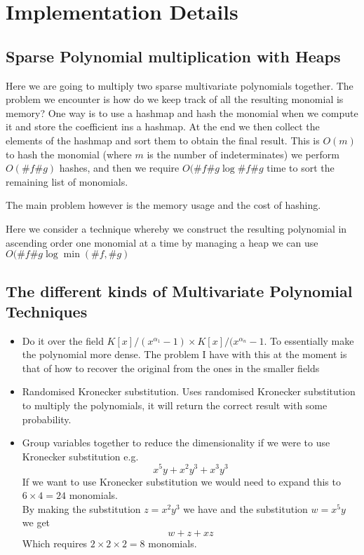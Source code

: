 \chapter{Implementation Details}\label{impl-details}

\section{Sparse Polynomial multiplication with Heaps}


Here we are going to multiply two sparse multivariate polynomials together. The problem we encounter is how do we keep track of all the resulting monomial is memory? One way is to use a hashmap and hash the monomial when we compute it and store the coefficient ins a hashmap. At the end we then collect the elements of the hashmap and sort them to obtain the final result. This is $O(m)$ to hash the monomial (where $m$ is the number of indeterminates) we perform $O(\# f \# g)$ hashes, and then we require $O(\#f \#g \log \# f \# g$ time to sort the remaining list of monomials.

The main problem however is the memory usage and the cost of hashing.

Here we consider a technique whereby we construct the resulting polynomial in ascending order one monomial at a time by managing a heap we can use $O(\#f \#g \log \min(\# f, \# g)$



\section{The different kinds of Multivariate Polynomial Techniques}

\begin{itemize}
    \item Do it over the field $K[x]/(x^{\alpha_1} -1) \times K[x]/(x^{\alpha_n} -1$. To essentially make the polynomial more dense. The problem I have with this at the moment is that of how to recover the original from the ones in the smaller fields
    \item Randomised Kronecker substitution. Uses randomised Kronecker substitution to multiply the polynomials, it will return the correct result with some probability.
    \item Group variables together to reduce the dimensionality if we were to use Kronecker substitution e.g.
        \[
        x^5y + x^2y^3 + x^3y^3
    \]
    If we want to use Kronecker substitution we would need to expand this to $6 \times 4 = 24$ monomials.\\
    By making the substitution $z = x^2y^3$ we have and the substitution $w = x^5y$ we get
    \[
        w + z + xz
    \]
    Which requires $2 \times 2 \times 2 = 8$ monomials.

\end{itemize}

